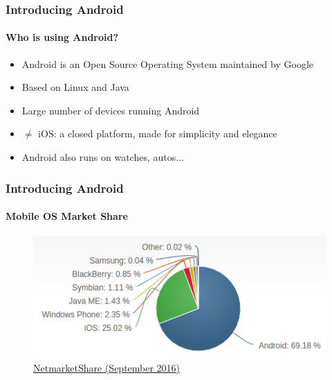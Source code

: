 \documentclass{beamer}
\begin{document}
	\begin{frame}
	\frametitle{Introducing Android}
	\framesubtitle{Who is using Android?}
	\begin{itemize}
		\item Android is an Open Source Operating System maintained by Google
		\item Based on Linux and Java
		\item Large number of devices running Android
		\item $\neq$ iOS: a closed platform, made for simplicity and elegance
		\item Android also runs on watches, autos...
	\end{itemize}
	\end{frame}

	\begin{frame}
	\frametitle{Introducing Android}
	\framesubtitle{Mobile OS Market Share}
	        \begin{figure}[h]
                \centering
                \includegraphics[width=\textwidth]{./images/netmarketshare201609-mobileOS}
                \caption[font=tiny]{\href{https://www.netmarketshare.com/operating-system-market-share.aspx?qprid=8&qpcustomd=1}{NetmarketShare (September 2016)}}
        	\end{figure}
	\end{frame}
\end{document}
